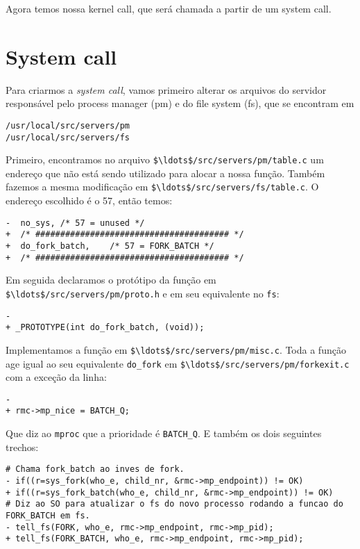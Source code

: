 \documentclass{amsart}
\theoremstyle{plain}
\newcommand{\code}[1]{\lstinline[mathescape=true]{#1}}
\newcommand{\mcode}[1]{\lstinline[mathescape]!#1!}
\begin{document}
Agora temos nossa kernel call, que será chamada a partir de um system call.

\section{System call}

Para criarmos a \textit{system call}, vamos primeiro alterar os arquivos do servidor responsável
pelo process manager (pm) e do file system (fs), que se encontram em

\begin{lstlisting}[frame=leftline,mathescape=true,style=nonumbers]
/usr/local/src/servers/pm
/usr/local/src/servers/fs
\end{lstlisting}

Primeiro, encontramos no arquivo \mcode{$\ldots$/src/servers/pm/table.c} um endereço que não está
sendo utilizado para alocar a nossa função. Também fazemos a mesma modificação em
\mcode{$\ldots$/src/servers/fs/table.c}. O endereço escolhido é o 57, então temos:

\begin{lstlisting}[frame=leftline,mathescape=true,style=nonumbers]
-  no_sys, /* 57 = unused */
+  /* ####################################### */
+  do_fork_batch,    /* 57 = FORK_BATCH */
+  /* ####################################### */
\end{lstlisting}

Em seguida declaramos o protótipo da função em \mcode{$\ldots$/src/servers/pm/proto.h} e em seu
equivalente no \code{fs}:

\begin{lstlisting}[frame=leftline,mathescape=true,style=nonumbers]
-
+ _PROTOTYPE(int do_fork_batch, (void));
\end{lstlisting}

Implementamos a função em \mcode{$\ldots$/src/servers/pm/misc.c}. Toda a função age igual ao seu
equivalente \code{do_fork} em \mcode{$\ldots$/src/servers/pm/forkexit.c} com a exceção da linha:

\begin{lstlisting}[frame=leftline,mathescape=true,style=nonumbers]
-
+ rmc->mp_nice = BATCH_Q;
\end{lstlisting}

Que diz ao \code{mproc} que a prioridade é \code{BATCH_Q}. E também os dois seguintes trechos:

\begin{lstlisting}[frame=leftline,mathescape=true,style=nonumbers]
# Chama fork_batch ao inves de fork.
- if((r=sys_fork(who_e, child_nr, &rmc->mp_endpoint)) != OK)
+ if((r=sys_fork_batch(who_e, child_nr, &rmc->mp_endpoint)) != OK)
# Diz ao SO para atualizar o fs do novo processo rodando a funcao do FORK_BATCH em fs.
- tell_fs(FORK, who_e, rmc->mp_endpoint, rmc->mp_pid);
+ tell_fs(FORK_BATCH, who_e, rmc->mp_endpoint, rmc->mp_pid);
\end{lstlisting}
\end{document}
